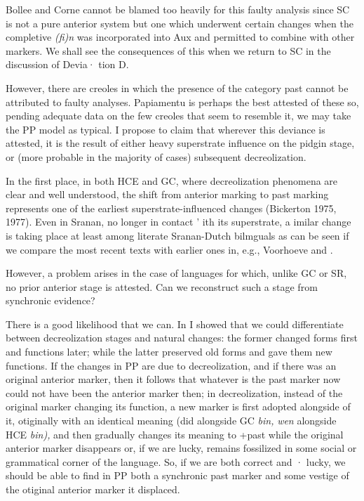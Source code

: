 Bollee and Corne cannot be blamed too heavily for this faulty analysis since SC is not a pure anterior system but one which under\-went certain changes when the completive \textit{(fi)n} was incorporated into Aux and permitted to combine with other markers. We shall see the
consequences of this when we return to SC in the discussion of Devia· tion D.

However, there are creoles in which the presence of the category past cannot be attributed to faulty analyses. Papiamentu is perhaps the best attested of these so, pending adequate data on the few creoles that seem to resemble it, we may take the PP model as typical. I pro\-pose to claim that wherever this deviance is attested, it is the result of either heavy superstrate influence on the pidgin stage, or (more prob\-able in the majority of cases) subsequent decreolization.

In the first place, in both HCE and GC, where decreolization phenomena are clear and well understood, the shift from anterior marking to past marking represents one of the earliest superstrate-influenced changes (Bickerton 1975, 1977). Even in Sranan, no longer in contact ' ith its superstrate, a imilar change is taking place at least among literate Sranan-Dutch bilmguals as can be seen if we compare the
most recent texts with earlier ones in, e.g., Voorhoeve and \citet{Lichtveld1976}.

However, a problem arises in the case of languages for which, unlike GC or SR, no prior anterior stage is attested. Can we reconstruct such a stage from synchronic evidence?

There is a good likelihood that we can. In \citet{Bickerton1980} I showed that we could differentiate between decreolization stages and natural changes: the former changed forms first and functions later; while the latter preserved old forms and gave them new functions. If the changes in PP are due to decreolization, and if there was an original anterior marker, then it follows that whatever is the past
marker now could not have been the anterior marker then; in decreoli\-zation, instead of the original marker changing its function, a new marker is first adopted alongside of it, otiginally with an identical meaning (did alongside GC \textit{bin,} \textit{wen }alongside HCE \textit{bin}\textit{),} and then gradually changes its meaning to +past while the original anterior marker disappears or, if we are lucky, remains fossilized in some social or grammatical corner of the language. So, if we are both correct and · lucky, we should be able to find in PP both a synchronic past marker
and some vestige of the otiginal anterior marker it displaced.

